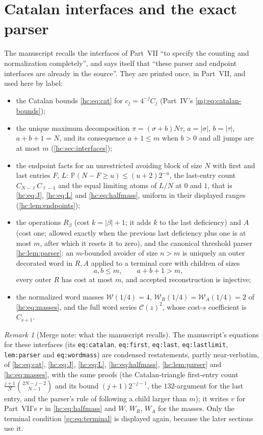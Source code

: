 \documentclass[11pt,a4paper]{article}
\theoremstyle{definition}\newaliascnt{definition}{theorem}
\theoremstyle{remark}\newaliascnt{remark}{theorem}
\newtheorem{remark}[remark]{Remark}
\newcommand{\Cat}{\mathcal C}
\newcommand{\ljP}{\mathbb P}
\begin{document}
\section{Catalan interfaces and the exact parser}
\label{gc:sec:interfaces}
The manuscript recalls the interfaces of Part~VII ``to specify the counting
and normalization completely'', and says itself that ``these parser and
endpoint interfaces are already in the source''. They are printed once, in
Part~VII, and used here by label:
\begin{itemize}
\item the Catalan bounds \eqref{hc:eq:cat} for $c_j=4^{-j}C_j$ (Part~IV's
 \eqref{mj:eq:catalan-bounds});
\item the unique maximum decomposition $\pi=(\sigma+b)N\tau$, $a=|\sigma|$,
 $b=|\tau|$, $a+b+1=N$, and its consequence $a+1\le m$ when $b>0$ and all jumps
 are at most $m$ (\cref{hc:sec:interfaces});
\item the endpoint facts for an unrestricted avoiding block of size $N$ with
 first and last entries $F$, $L$: $\ljP(N-F\ge u)\le(u+2)2^{-u}$, the last-entry
 count $C_{N-\ell}C_{\ell-1}$ and the equal limiting atoms of $L/N$ at $0$
 and $1$, that is \eqref{hc:eq:J}, \eqref{hc:eq:L} and \eqref{hc:eq:halfmass},
 uniform in their displayed ranges (\cref{hc:lem:endpoints});
\item the operations $R_\beta$ (cost $k=|\beta|+1$; it adds $k$ to the last
 deficiency) and $A$ (cost one; allowed exactly when the previous last
 deficiency plus one is at most $m$, after which it resets it to zero), and
 the canonical threshold parser \cref{hc:lem:parser}: an $m$-bounded avoider
 of size $n>m$ is uniquely an outer decorated word in $R,A$ applied to a
 terminal core with children of sizes
 \begin{equation}\label{gc:eq:terminal}
  a,b\le m,\qquad a+b+1>m,
 \end{equation}
 every outer $R$ has cost at most $m$, and accepted reconstruction is
 injective;
\item the normalized word masses $\mathcal W(1/4)=4$,
 $\mathcal W_R(1/4)=\mathcal W_A(1/4)=2$ of \eqref{hc:eq:masses}, and the full
 word series $\Cat(z)^2$, whose cost-$s$ coefficient is $C_{s+1}$.
\end{itemize}

\begin{remark}[Merge note: what the manuscript recalls]
The manuscript's equations for these interfaces (its
\texttt{eq:catalan}, \texttt{eq:first}, \texttt{eq:last},
\texttt{eq:lastlimit}, \texttt{lem:parser} and \texttt{eq:wordmass}) are
condensed restatements, partly near-verbatim, of
\eqref{hc:eq:cat}, \eqref{hc:eq:J}, \eqref{hc:eq:L}, \eqref{hc:eq:halfmass},
\cref{hc:lem:parser} and \eqref{hc:eq:masses}, with the same proofs (the
Catalan-triangle first-entry count $\frac{j+1}{N}\binom{2N-j-2}{N-1}$ and its
bound $(j+1)2^{-j-1}$, the $132$-argument for the last entry, and the
parser's rule of following a child larger than $m$); it writes $v$ for
Part~VII's $r$ in \eqref{hc:eq:halfmass} and $W$, $W_R$, $W_A$ for the masses.
Only the terminal condition \eqref{gc:eq:terminal} is displayed again, because
the later sections use it.
\end{remark}
\end{document}
